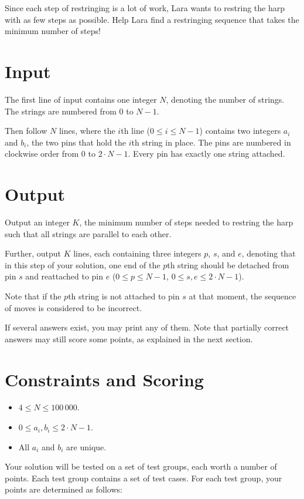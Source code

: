 Since each step of restringing is a lot of work, Lara wants to restring the harp with as few steps as possible.
Help Lara find a restringing sequence that takes the minimum number of steps!

\section*{Input}
The first line of input contains one integer $N$, denoting the number of strings.
The strings are numbered from $0$ to $N - 1$.

Then follow $N$ lines, where the $i$th line ($0\le i \le N-1$) contains two integers $a_i$ and $b_i$, the two pins that hold the $i$th string in place.
The pins are numbered in clockwise order from $0$ to $2\cdot N - 1$.
Every pin has exactly one string attached.

\section*{Output}
Output an integer $K$, the minimum number of steps needed to restring the harp such that all strings are parallel to each other.

Further, output $K$ lines, each containing three integers $p$, $s$, and $e$, denoting that in this step of your solution, one end of the $p$th string should be detached from pin $s$ and reattached to pin $e$ ($0 \leq p \leq N - 1$, $0 \leq s, e \leq 2\cdot N - 1$).

Note that if the $p$th string is not attached to pin $s$ at that moment, the sequence of moves is considered to be incorrect.

If several answers exist, you may print any of them. Note that partially correct answers may still score some points, as explained in the next section.

\section*{Constraints and Scoring}
\begin{itemize}
\item $4 \leq N \leq 100\,000$.
\item $0 \leq a_i, b_i \leq 2\cdot N - 1$.
\item All $a_i$ and $b_i$ are unique.
\end{itemize}


Your solution will be tested on a set of test groups, each worth a number of points.
Each test group contains a set of test cases. 
For each test group, your points are determined as follows:

